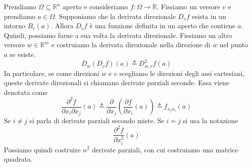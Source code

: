 \documentclass[a4paper]{article}
\begin{document}
Prendiamo \(\Omega \subseteq \mathbb{R}^n\) aperto
e consideriamo \(f \colon \Omega \to \mathbb{R}\).
Fissiamo un versore \(v\) e prendiamo \(a \in \Omega\).
Supponiamo che la derivata direzionale \(D_v f\) esista in un intorno
\(B_r(a)\).
Allora \(D_vf\) è una funzione
definita in un aperto che contiene \(a\).
Quindi, possiamo farne a sua volta la derivata direzionale.
Fissiamo un altro versore \(w \in \mathbb{R}^m\) e costruiamo la derivata direzionale
nella direzione di \(w\) nel punto \(a\) se esiste.
\[
    D_w(D_v f)(a) \triangleq D^2_{w,v} f(a)
\]
In particolare, se come direzioni \(w\) e \(v\) scegliamo le direzioni degli assi cartesiani,
queste derivate direzionali si chiamano derivate parziali seconde.
Essa viene denotata come
\[
    \frac{\partial^2 f}{\partial x_i \partial x_j}(a)
    \triangleq \frac{\partial}{\partial x_j} \left(
        \frac{\partial f}{\partial x_i}(a)
    \right) \triangleq f_{x_jx_i}(a)
\]
Se \(i \neq j\) si parla di derivate parziali secondo miste.
Se \(i = j\) si usa la notazione
\[
    \frac{\partial^2f}{\partial x_i^2}(a)
\]
Possiamo quindi costruire \(n^2\)
derivate parziali, con cui costruiamo una matrice quadrata.


\end{document}

